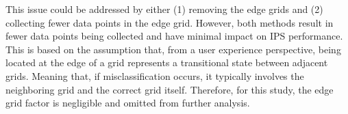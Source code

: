 \documentclass[runningheads]{llncs}
\begin{document}
This issue could be addressed by either (1) removing the edge grids and (2) collecting fewer data points in the edge grid. However, both methods result in fewer data points being collected and have minimal impact on IPS performance. This is based on the assumption that, from a user experience perspective, being located at the edge of a grid represents a transitional state between adjacent grids. Meaning that, if misclassification occurs, it typically involves the neighboring grid and the correct grid itself. Therefore, for this study, the edge grid factor is negligible and omitted from further analysis.
\end{document}
